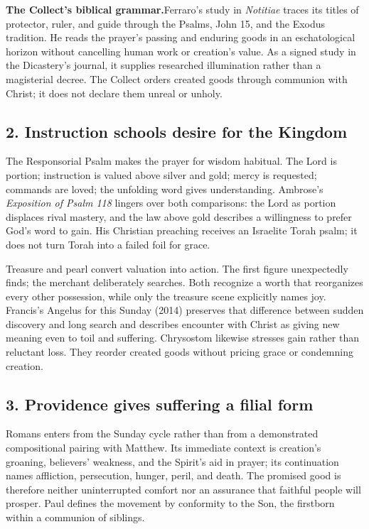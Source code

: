 \begin{deepstudy}
{\noindent\textbf{The Collect's biblical grammar.}\enspace Ferraro's study in \emph{Notitiae} traces its titles of protector, ruler, and guide through the Psalms, John 15, and the Exodus tradition. He reads the prayer's passing and enduring goods in an eschatological horizon without cancelling human work or creation's value. As a signed study in the Dicastery's journal, it supplies researched illumination rather than a magisterial decree. The Collect orders created goods through communion with Christ; it does not declare them unreal or unholy.

\subsection*{2. Instruction schools desire for the Kingdom\enspace{}}

The Responsorial Psalm makes the prayer for wisdom habitual. The Lord is portion; instruction is valued above silver and gold; mercy is requested; commands are loved; the unfolding word gives understanding. Ambrose's \emph{Exposition of Psalm 118} lingers over both comparisons: the Lord as portion displaces rival mastery, and the law above gold describes a willingness to prefer God's word to gain. His Christian preaching receives an Israelite Torah psalm; it does not turn Torah into a failed foil for grace.

Treasure and pearl convert valuation into action. The first figure unexpectedly finds; the merchant deliberately searches. Both recognize a worth that reorganizes every other possession, while only the treasure scene explicitly names joy. Francis's Angelus for this Sunday (2014) preserves that difference between sudden discovery and long search and describes encounter with Christ as giving new meaning even to toil and suffering. Chrysostom likewise stresses gain rather than reluctant loss. They reorder created goods without pricing grace or condemning creation.

\newpage

\subsection*{3. Providence gives suffering a filial form\enspace{}}

Romans enters from the Sunday cycle rather than from a demonstrated compositional pairing with Matthew. Its immediate context is creation's groaning, believers' weakness, and the Spirit's aid in prayer; its continuation names affliction, persecution, hunger, peril, and death. The promised good is therefore neither uninterrupted comfort nor an assurance that faithful people will prosper. Paul defines the movement by conformity to the Son, the firstborn within a communion of siblings.

}
\end{deepstudy}
